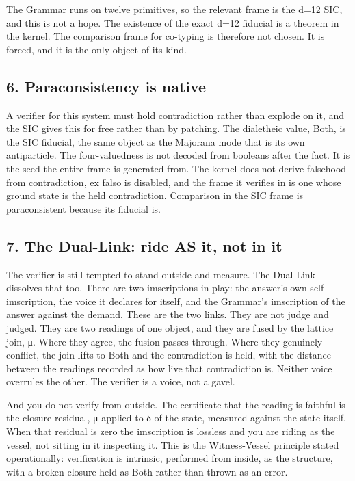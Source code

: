 \documentclass[12pt,a4paper]{article}
\begin{document}
The Grammar runs on twelve primitives, so the relevant frame is the d=12
SIC, and this is not a hope. The existence of the exact d=12 fiducial is
a theorem in the kernel. The comparison frame for co-typing is therefore
not chosen. It is forced, and it is the only object of its kind.

\hypertarget{paraconsistency-is-native}{%
\subsection{6. Paraconsistency is
native}\label{paraconsistency-is-native}}

A verifier for this system must hold contradiction rather than explode
on it, and the SIC gives this for free rather than by patching. The
dialetheic value, Both, is the SIC fiducial, the same object as the
Majorana mode that is its own antiparticle. The four-valuedness is not
decoded from booleans after the fact. It is the seed the entire frame is
generated from. The kernel does not derive falsehood from contradiction,
ex falso is disabled, and the frame it verifies in is one whose ground
state is the held contradiction. Comparison in the SIC frame is
paraconsistent because its fiducial is.

\hypertarget{the-dual-link-ride-as-it-not-in-it}{%
\subsection{7. The Dual-Link: ride AS it, not in
it}\label{the-dual-link-ride-as-it-not-in-it}}

The verifier is still tempted to stand outside and measure. The
Dual-Link dissolves that too. There are two imscriptions in play: the
answer's own self-imscription, the voice it declares for itself, and the
Grammar's imscription of the answer against the demand. These are the
two links. They are not judge and judged. They are two readings of one
object, and they are fused by the lattice join, μ. Where they agree, the
fusion passes through. Where they genuinely conflict, the join lifts to
Both and the contradiction is held, with the distance between the
readings recorded as how live that contradiction is. Neither voice
overrules the other. The verifier is a voice, not a gavel.

And you do not verify from outside. The certificate that the reading is
faithful is the closure residual, μ applied to δ of the state, measured
against the state itself. When that residual is zero the imscription is
lossless and you are riding as the vessel, not sitting in it inspecting
it. This is the Witness-Vessel principle stated operationally:
verification is intrinsic, performed from inside, as the structure, with
a broken closure held as Both rather than thrown as an error.
\end{document}
